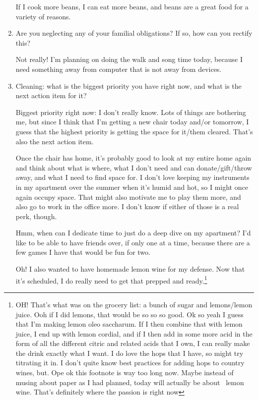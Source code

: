 \documentclass[12pt]{article}
\renewcommand{\,}{\textsuperscript{,}}
\begin{document}
\begin{enumerate}
If I cook more beans, I can eat more beans, and beans are a great food for a variety of reasons.

\item Are you neglecting any of your familial obligations? If so, how can you rectify this?

Not really! I'm planning on doing the walk and song time today, because I need something away from computer that is not away from devices.

\item Cleaning: what is the biggest priority you have right now, and what is the next action item for it?

Biggest priority right now: I don't really know. Lots of things are bothering me, but since I think that I'm getting a new chair today and/or tomorrow, I guess that the highest priority is getting the space for it/them cleared.  
That's also the next action item.

Once the chair has home, it's probably good to look at my entire home again and think about what is where, what I don't need and can donate/gift/throw away, and what I need to find space for.  
I don't love keeping my instruments in my apartment over the summer when it's humid and hot, so I might once again occupy space. That might also motivate me to play them more, and also go to work in the office more.  
I don't know if either of those is a real perk, though.

Hmm, when can I dedicate time to just do a deep dive on my apartment?  
I'd like to be able to have friends over, if only one at a time, because there are a few games I have that would be fun for two.

Oh! I also wanted to have homemade lemon wine for my defense. Now that it's scheduled, I do really need to get that prepped and ready.\footnote{OH! That's what was on the grocery list: a bunch of sugar and lemons/lemon juice. Ooh if I did lemons, that would be so so so good. Ok so yeah I guess that I'm making lemon oleo saccharum. If I then combine that with lemon juice, I end up with lemon cordial, and if I then add in some more acid in the form of all the different citric and related acids that I own, I can really make the drink exactly what I want. I do love the hops that I have, so might try titrating it in. I don't quite know best practices for adding hops to country wines, but. Ope ok this footnote is way too long now. Maybe instead of musing about paper as I had planned, today will actually be about  lemon wine. That's definitely where the passion is right now}


\end{enumerate}
\end{document}
